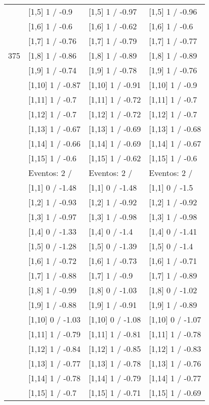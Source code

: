 \begin{table}
\begin{tabular}[t]{llll}
 & {}[1,5] 1  / -0.9 & {}[1,5] 1  / -0.97 & {}[1,5] 1  / -0.96\\
 & {}[1,6] 1  / -0.6 & {}[1,6] 1  / -0.62 & {}[1,6] 1  / -0.6\\
 & {}[1,7] 1  / -0.76 & {}[1,7] 1  / -0.79 & {}[1,7] 1  / -0.77\\
375 & {}[1,8] 1  / -0.86 & {}[1,8] 1  / -0.89 & {}[1,8] 1  / -0.89\\
\addlinespace
 & {}[1,9] 1  / -0.74 & {}[1,9] 1  / -0.78 & {}[1,9] 1  / -0.76\\
 & {}[1,10] 1  / -0.87 & {}[1,10] 1  / -0.91 & {}[1,10] 1  / -0.9\\
 & {}[1,11] 1  / -0.7 & {}[1,11] 1  / -0.72 & {}[1,11] 1  / -0.7\\
 & {}[1,12] 1  / -0.7 & {}[1,12] 1  / -0.72 & {}[1,12] 1  / -0.7\\
 & {}[1,13] 1  / -0.67 & {}[1,13] 1  / -0.69 & {}[1,13] 1  / -0.68\\
\addlinespace
 & {}[1,14] 1  / -0.66 & {}[1,14] 1  / -0.69 & {}[1,14] 1  / -0.67\\
 & {}[1,15] 1  / -0.6 & {}[1,15] 1  / -0.62 & {}[1,15] 1  / -0.6\\
 & Eventos:  2 / & Eventos:  2 / & Eventos:  2 /\\
 & {}[1,1] 0  / -1.48 & {}[1,1] 0  / -1.48 & {}[1,1] 0  / -1.5\\
 & {}[1,2] 1  / -0.93 & {}[1,2] 1  / -0.92 & {}[1,2] 1  / -0.92\\
\addlinespace
 & {}[1,3] 1  / -0.97 & {}[1,3] 1  / -0.98 & {}[1,3] 1  / -0.98\\
 & {}[1,4] 0  / -1.33 & {}[1,4] 0  / -1.4 & {}[1,4] 0  / -1.41\\
 & {}[1,5] 0  / -1.28 & {}[1,5] 0  / -1.39 & {}[1,5] 0  / -1.4\\
 & {}[1,6] 1  / -0.72 & {}[1,6] 1  / -0.73 & {}[1,6] 1  / -0.71\\
 & {}[1,7] 1  / -0.88 & {}[1,7] 1  / -0.9 & {}[1,7] 1  / -0.89\\
\addlinespace
500 & {}[1,8] 1  / -0.99 & {}[1,8] 0  / -1.03 & {}[1,8] 0  / -1.02\\
 & {}[1,9] 1  / -0.88 & {}[1,9] 1  / -0.91 & {}[1,9] 1  / -0.89\\
 & {}[1,10] 0  / -1.03 & {}[1,10] 0  / -1.08 & {}[1,10] 0  / -1.07\\
 & {}[1,11] 1  / -0.79 & {}[1,11] 1  / -0.81 & {}[1,11] 1  / -0.78\\
 & {}[1,12] 1  / -0.84 & {}[1,12] 1  / -0.85 & {}[1,12] 1  / -0.83\\
\addlinespace
 & {}[1,13] 1  / -0.77 & {}[1,13] 1  / -0.78 & {}[1,13] 1  / -0.76\\
 & {}[1,14] 1  / -0.78 & {}[1,14] 1  / -0.79 & {}[1,14] 1  / -0.77\\
 & {}[1,15] 1  / -0.7 & {}[1,15] 1  / -0.71 & {}[1,15] 1  / -0.69\\
\bottomrule
\end{tabular}
\end{table}
